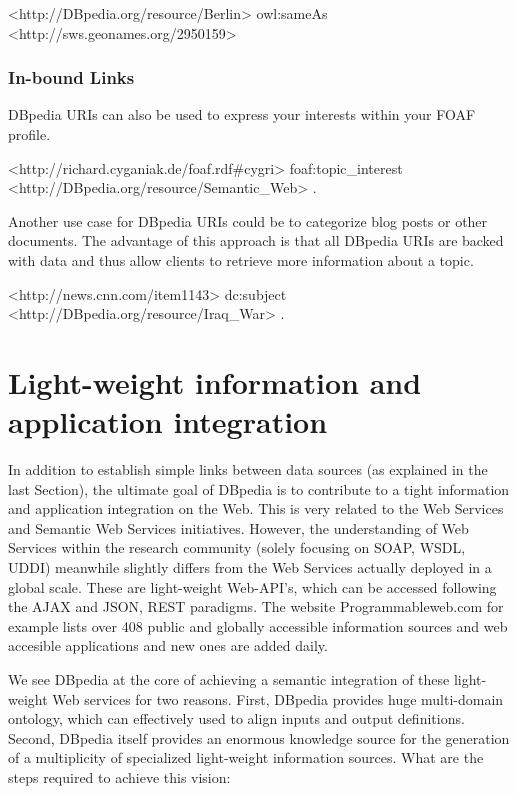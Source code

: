 \documentclass{llncs}
\begin{document}
\begin{verbatim*}
<http://DBpedia.org/resource/Berlin> owl:sameAs <http://sws.geonames.org/2950159>
\end{verbatim*}

\subsubsection{In-bound Links}

DBpedia URIs can also be used to express your interests within your FOAF profile.

\begin{verbatim*}
<http://richard.cyganiak.de/foaf.rdf#cygri> foaf:topic_interest <http://DBpedia.org/resource/Semantic_Web> .
\end{verbatim*}

Another use case for DBpedia URIs could be to categorize blog posts or other documents. The advantage of this approach is that all DBpedia URIs are backed with data and thus allow clients to retrieve more information about a topic.

\begin{verbatim*}
<http://news.cnn.com/item1143> dc:subject <http://DBpedia.org/resource/Iraq_War> .
\end{verbatim*}

\section{Light-weight information and application integration}

In addition to establish simple links between data sources (as explained in the last Section), the ultimate goal of DBpedia is to contribute to a tight information and application integration on the Web. This is very related to the Web Services and Semantic Web Services initiatives. However, the understanding of Web Services within the research community (solely focusing on SOAP, WSDL, UDDI) meanwhile slightly differs from the Web Services actually deployed in a global scale. These are light-weight Web-API's, which can be accessed following the AJAX and JSON, REST paradigms. The website Programmableweb.com for example lists over 408 public and globally accessible information sources and web accesible applications and new ones are added daily.

We see DBpedia at the core of achieving a semantic integration of these light-weight Web services for two reasons. First, DBpedia provides huge multi-domain ontology, which can effectively used to align inputs and output definitions. Second, DBpedia itself provides an enormous knowledge source for the generation of a multiplicity of specialized light-weight information sources. What are the steps required to achieve this vision:
\end{document}
